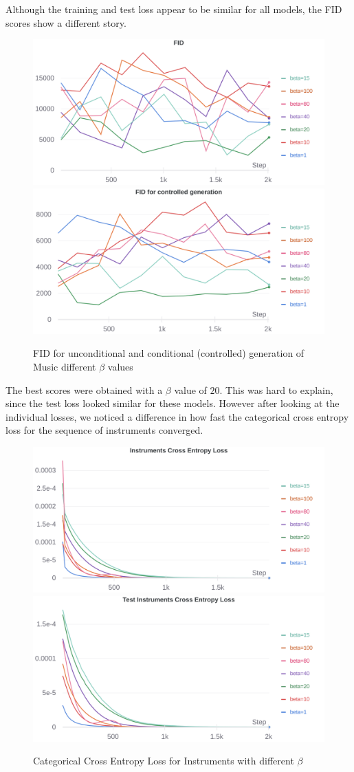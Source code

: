 \documentclass{article}
\begin{document}
Although the training and test loss appear to be similar for all models, the FID scores show a different story.

\begin{figure}[h]
\begin{center}
\includegraphics[width=0.4\linewidth]{combined_fid.png}
\includegraphics[width=0.4\linewidth]{combined_fid_controlled.png}
\caption{FID for unconditional and conditional (controlled) generation of Music different $\beta$ values}
\end{center}
\end{figure}

The best scores were obtained with a $\beta$ value of $20$. This was hard to explain, since the test loss looked similar for these models. However after looking at the individual losses, we noticed a difference in how fast the categorical cross entropy loss for the sequence of instruments converged. 

\begin{figure}[h]
\begin{center}
\includegraphics[width=0.4\linewidth]{combined_instruments.png}
\includegraphics[width=0.4\linewidth]{combined_test_instruments.png}
\caption{Categorical Cross Entropy Loss for Instruments with different $\beta$}
\end{center}
\end{figure}
\end{document}
